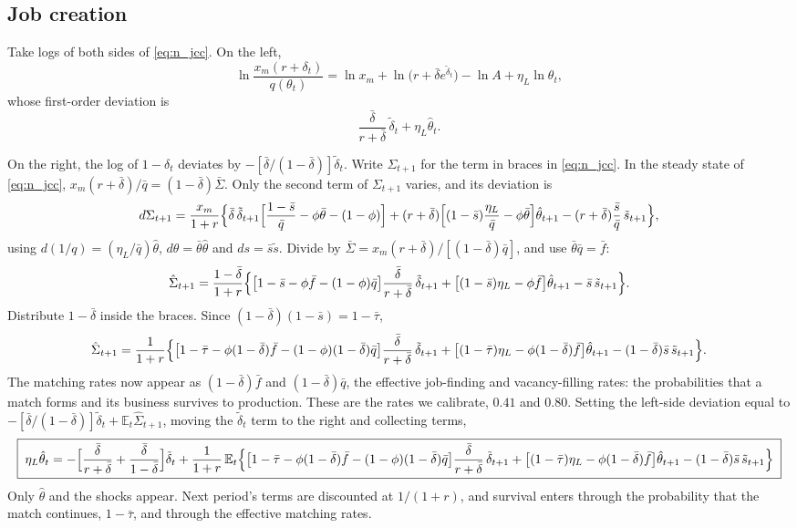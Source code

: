 \documentclass[authoryear, review, 12pt]{elsarticle}
\begin{document}
\subsection{Job creation}

Take logs of both sides of \eqref{eq:n_jcc}. On the left,
\[
	\ln\frac{x_m(r+\delta_t)}{q(\theta_t)}
	=\ln x_m+\ln\bigl(r+\bar\delta e^{\tilde\delta_t}\bigr)-\ln A+\eta_L\ln\theta_t ,
\]
whose first-order deviation is
\[
	\frac{\bar\delta}{r+\bar\delta}\,\tilde\delta_t+\eta_L\hat\theta_t .
\]

On the right, the log of $1-\delta_t$ deviates by $-[\bar\delta/(1-\bar\delta)]\tilde\delta_t$.
Write $\Sigma_{t+1}$ for the term in braces in \eqref{eq:n_jcc}. In the steady state of
\eqref{eq:n_jcc}, $x_m(r+\bar\delta)/\bar q=(1-\bar\delta)\bar\Sigma$. Only the second term
of $\Sigma_{t+1}$ varies, and its deviation is
\[
	d\Sigma_{t+1}=\frac{x_m}{1+r}\Bigl\{\bar\delta\,\tilde\delta_{t+1}
	\Bigl[\frac{1-\bar s}{\bar q}-\phi\bar\theta-(1-\phi)\Bigr]
	+(r+\bar\delta)\Bigl[(1-\bar s)\frac{\eta_L}{\bar q}-\phi\bar\theta\Bigr]\hat\theta_{t+1}
	-(r+\bar\delta)\frac{\bar s}{\bar q}\,\tilde s_{t+1}\Bigr\},
\]
using $d(1/q)=(\eta_L/\bar q)\hat\theta$, $d\theta=\bar\theta\hat\theta$ and
$ds=\bar s\tilde s$. Divide by $\bar\Sigma=x_m(r+\bar\delta)/[(1-\bar\delta)\bar q]$, and use
$\bar\theta\bar q=\bar f$:
\[
	\hat\Sigma_{t+1}=\frac{1-\bar\delta}{1+r}\Bigl\{\bigl[1-\bar s-\phi\bar f-(1-\phi)\bar q\bigr]\frac{\bar\delta}{r+\bar\delta}\,\tilde\delta_{t+1}
	+\bigl[(1-\bar s)\eta_L-\phi\bar f\bigr]\hat\theta_{t+1}-\bar s\,\tilde s_{t+1}\Bigr\}.
\]
Distribute $1-\bar\delta$ inside the braces. Since $(1-\bar\delta)(1-\bar s)=1-\bar\tau$,
\[
	\hat\Sigma_{t+1}=\frac{1}{1+r}\Bigl\{\bigl[1-\bar\tau-\phi(1-\bar\delta)\bar f-(1-\phi)(1-\bar\delta)\bar q\bigr]\frac{\bar\delta}{r+\bar\delta}\,\tilde\delta_{t+1}
	+\bigl[(1-\bar\tau)\eta_L-\phi(1-\bar\delta)\bar f\bigr]\hat\theta_{t+1}
	-(1-\bar\delta)\bar s\,\tilde s_{t+1}\Bigr\}.
\]
The matching rates now appear as $(1-\bar\delta)\bar f$ and $(1-\bar\delta)\bar q$, the
effective job-finding and vacancy-filling rates: the probabilities that a match forms and
its business survives to production. These are the rates we calibrate, $0.41$ and $0.80$.
Setting the left-side deviation equal to
$-[\bar\delta/(1-\bar\delta)]\tilde\delta_t+\mathbb{E}_t\hat\Sigma_{t+1}$, moving the
$\tilde\delta_t$ term to the right and collecting terms,
\begin{equation}\label{eq:l_jcc}
	\boxed{\;
	\eta_L\hat\theta_t
	=-\Bigl[\frac{\bar\delta}{r+\bar\delta}+\frac{\bar\delta}{1-\bar\delta}\Bigr]\tilde\delta_t
	+\frac{1}{1+r}\,\mathbb{E}_t\Bigl\{\bigl[1-\bar\tau-\phi(1-\bar\delta)\bar f-(1-\phi)(1-\bar\delta)\bar q\bigr]\frac{\bar\delta}{r+\bar\delta}\,\tilde\delta_{t+1}
	+\bigl[(1-\bar\tau)\eta_L-\phi(1-\bar\delta)\bar f\bigr]\hat\theta_{t+1}
	-(1-\bar\delta)\bar s\,\tilde s_{t+1}\Bigr\}\;}
\end{equation}
Only $\hat\theta$ and the shocks appear. Next period's terms are discounted at $1/(1+r)$,
and survival enters through the probability that the match continues, $1-\bar\tau$, and
through the effective matching rates.
\end{document}
